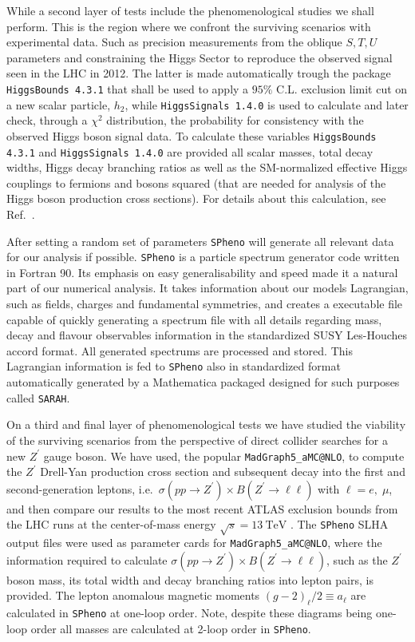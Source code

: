 \documentclass[10pt]{book}
\newcommand{\ro}[1]{\textrm{#1}}
\renewcommand{\(}{\left(}
\renewcommand{\)}{\right)}
\renewcommand{\[}{\left[}
\renewcommand{\]}{\right]}
\begin{document}
While a second layer of tests include the phenomenological studies we shall perform. 
%
This is the region where we confront the surviving scenarios with experimental data. 
%
Such as precision measurements from the oblique $S,T,U$ parameters and constraining the Higgs Sector to reproduce the observed signal seen in the LHC in 2012. 
%
The latter is made automatically trough the package \texttt{HiggsBounds 4.3.1} that shall be used to apply a $95\%$ C.L. exclusion limit cut on a new scalar particle, $h_2$, while \texttt{HiggsSignals 1.4.0} is used to calculate and later check, through a $\chi^2$ distribution, the probability for consistency with the observed Higgs boson signal data. 
% 
To calculate these variables \texttt{HiggsBounds 4.3.1} and \texttt{HiggsSignals 1.4.0} are provided all scalar masses, total decay widths, Higgs decay branching ratios as well as the SM-normalized effective Higgs couplings to fermions and bosons squared (that are needed for analysis of the Higgs boson production cross sections). For details about this calculation, see Ref.~\cite{Bechtle:2013wla}.

{ \color{gray} After setting a random set of parameters \texttt{SPheno} will generate all relevant data for our analysis if possible. \texttt{SPheno} is a particle spectrum generator code written in Fortran 90. Its emphasis on easy generalisability and speed made it a natural part of our numerical analysis. It takes information about our models Lagrangian, such as fields, charges and fundamental symmetries, and creates a executable file capable of quickly generating a spectrum file with all details regarding mass, decay and flavour observables information in the standardized SUSY Les-Houches accord format. All generated spectrums are processed and stored. 
%
This Lagrangian information is fed to \texttt{SPheno} also in standardized format automatically generated by a Mathematica packaged designed for such purposes called \texttt{SARAH}. }

On a third and final layer of phenomenological tests we have studied the viability of the surviving scenarios from the perspective of direct collider searches for a new $Z^\prime$ gauge boson. 
%
We have used, the popular \texttt{MadGraph5\_aMC@NLO}, to compute the $Z^\prime$ Drell-Yan production cross section and subsequent decay into the first and second-generation leptons, i.e.~$ \sigma\left(pp \to Z^\prime\right) \times B\left(Z^\prime \to \ell \ell\right)$ with $\ell = e,\; \mu$, and then compare our results to the most recent ATLAS exclusion bounds from the LHC runs at the center-of-mass energy $\sqrt{s} = 13~\ro{TeV}$ \cite{Aaboud:2017buh}. 
%
The \texttt{SPheno} SLHA output files were used as parameter cards for \texttt{MadGraph5\_aMC@NLO}, where the information required to calculate $ \sigma\left(pp \to Z^\prime\right) \times B\left(Z^\prime \to \ell \ell\right)$, such as the $Z^\prime$ boson mass, its total width and decay branching ratios into lepton pairs, is provided. 
%
The lepton anomalous magnetic moments $\left( g-2 \right)_\ell /2 \equiv a_\ell$ are calculated in \texttt{SPheno} at one-loop order. Note, despite these diagrams being one-loop order all masses are calculated at 2-loop order in \texttt{SPheno}.  
\end{document}
